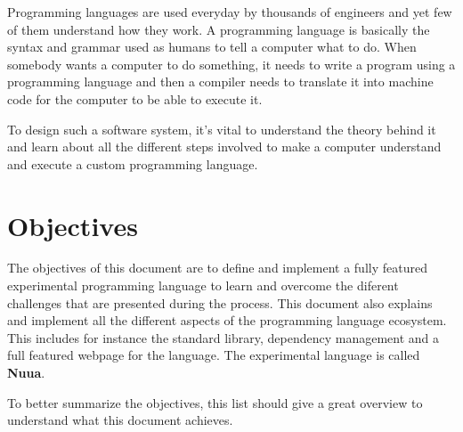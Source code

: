 Programming languages are used everyday by thousands of engineers and yet few of them understand how they work.
A programming language is basically the syntax and grammar used as humans to tell a computer what to do. When
somebody wants a computer to do something, it needs to write a program using a programming language and then
a compiler needs to translate it into machine code for the computer to be able to execute it.

To design such a software system, it's vital to understand the theory behind it and learn about all the different
steps involved to make a computer understand and execute a custom programming language.

\section{Objectives}

The objectives of this document are to define and implement a fully featured experimental programming language to learn and
overcome the diferent challenges that are presented during the process. This document also explains and implement
all the different aspects of the programming language ecosystem. This includes for instance the standard library,
dependency management and a full featured webpage for the language. The experimental language is called \textbf{Nuua}.

To better summarize the objectives, this list should give a great overview to understand what this document achieves.

